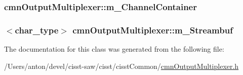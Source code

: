 \subsubsection[{m\+\_\+\+Channel\+Container}]{ cmn\+Output\+Multiplexer\+::m\+\_\+\+Channel\+Container\hspace{0.3cm}{\ttfamily [protected]}}\label{classcmn_output_multiplexer_a2bbdcfbb9a7395c5538432523ade4b1a}
\hypertarget{classcmn_output_multiplexer_a64c336dbeee16f5d94503c2a4265b97c}{}
\subsubsection[{m\+\_\+\+Streambuf}]{$<${\bf char\+\_\+type}$>$ cmn\+Output\+Multiplexer\+::m\+\_\+\+Streambuf\hspace{0.3cm}{\ttfamily [protected]}}\label{classcmn_output_multiplexer_a64c336dbeee16f5d94503c2a4265b97c}


The documentation for this class was generated from the following file\+:\begin{DoxyCompactItemize}
\item 
/\+Users/anton/devel/cisst-\/saw/cisst/cisst\+Common/\hyperlink{cmn_output_multiplexer_8h}{cmn\+Output\+Multiplexer.\+h}\end{DoxyCompactItemize}
